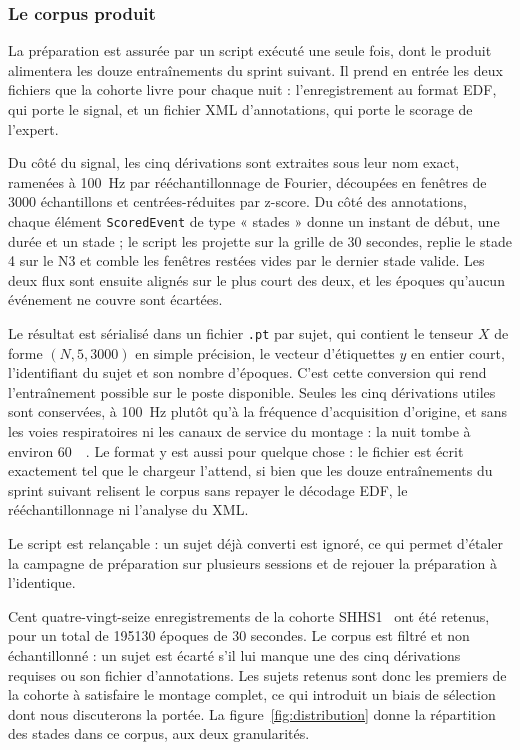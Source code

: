 \subsubsection{Le corpus produit}

La préparation est assurée par un script exécuté une seule fois, dont le produit
alimentera les douze entraînements du sprint suivant. Il prend en entrée les deux
fichiers que la cohorte livre pour chaque nuit : l'enregistrement au format EDF, qui
porte le signal, et un fichier XML d'annotations, qui porte le scorage de l'expert.

Du côté du signal, les cinq dérivations sont extraites sous leur nom exact, ramenées à
\SI{100}{\hertz} par rééchantillonnage de Fourier, découpées en fenêtres de \num{3000}
échantillons et centrées-réduites par z-score. Du côté des annotations, chaque élément
\texttt{ScoredEvent} de type « stades » donne un instant de début, une durée et un
stade ; le script les projette sur la grille de 30 secondes, replie le stade 4 sur le N3
et comble les fenêtres restées vides par le dernier stade valide. Les deux flux sont
ensuite alignés sur le plus court des deux, et les époques qu'aucun événement ne couvre
sont écartées.

Le résultat est sérialisé dans un fichier \texttt{.pt} par sujet, qui contient le
tenseur $X$ de forme $(N, 5, \num{3000})$ en simple précision, le vecteur d'étiquettes
$y$ en entier court, l'identifiant du sujet et son nombre d'époques. C'est cette
conversion qui rend l'entraînement possible sur le poste disponible. Seules les cinq
dérivations utiles sont conservées, à \SI{100}{\hertz} plutôt qu'à la fréquence
d'acquisition d'origine, et sans les voies respiratoires ni les canaux de service du
montage : la nuit tombe à environ \SI{60}{\mega\octet}. Le format y est aussi pour
quelque chose : le fichier est écrit exactement tel que le chargeur l'attend, si bien
que les douze entraînements du sprint suivant relisent le corpus sans repayer le
décodage EDF, le rééchantillonnage ni l'analyse du XML.

Le script est relançable : un sujet déjà converti est ignoré, ce qui permet
d'étaler la campagne de préparation sur plusieurs sessions et de rejouer la préparation
à l'identique.

Cent quatre-vingt-seize enregistrements de la cohorte SHHS1~\cite{quan1997} ont été
retenus, pour un total de \num{195130} époques de 30 secondes. Le
corpus est filtré et non échantillonné : un sujet est écarté s'il lui manque une
des cinq dérivations requises ou son fichier d'annotations. Les sujets retenus sont donc
les premiers de la cohorte à satisfaire le montage complet, ce qui introduit un biais de
sélection dont nous discuterons la portée. La figure~\ref{fig:distribution} donne la
répartition des stades dans ce corpus, aux deux granularités.

